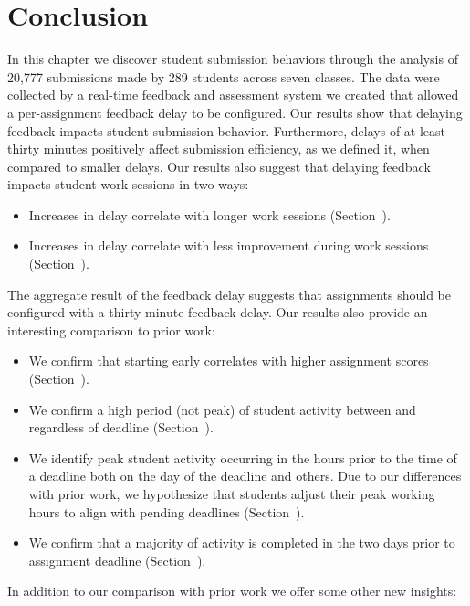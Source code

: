 \section{Conclusion} 
In this chapter we discover student submission behaviors through the analysis
of 20,777 submissions made by 289 students across seven classes. The data were
collected by a real-time feedback and assessment system we created that allowed
a per-assignment feedback delay to be configured. Our results show that
delaying feedback impacts student submission behavior. Furthermore, delays of
at least thirty minutes positively affect submission efficiency, as we defined
it, when compared to smaller delays. Our results also suggest that delaying
feedback impacts student work sessions in two ways:

\begin{itemize}
\item Increases in delay correlate with longer work sessions
  (Section~).
\item Increases in delay correlate with less improvement during work sessions
  (Section~).
\end{itemize}

The aggregate result of the feedback delay suggests that assignments should be
configured with a thirty minute feedback delay. Our results also provide an
interesting comparison to prior work:

\begin{itemize}
\item We confirm that starting early correlates with higher assignment
  scores (Section~).
\item We confirm a high period (not peak) of student activity between 
  and  regardless of deadline (Section~).
\item We identify peak student activity occurring in the hours prior to the
  time of a deadline both on the day of the deadline and others. Due to our
  differences with prior work, we hypothesize that students adjust their peak
  working hours to align with pending deadlines (Section~).
\item We confirm that a majority of activity is completed in the two days prior
  to assignment deadline (Section~).
\end{itemize}

In addition to our comparison with prior work we offer some other new insights:

